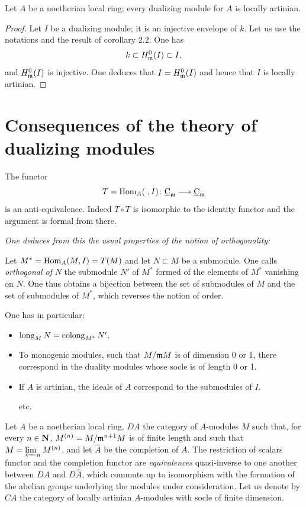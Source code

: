 \begin{corollary} \label{IV.4.9}
Let $A$ be a noetherian local ring; every dualizing module for $A$ is locally artinian.
\end{corollary}

\begin{proof}
Let $I$ be a dualizing module; it is an injective envelope of $k$. Let us use the notations and the result of corollary 2.2. One has
$$
k\subset H^{0}_{\mm}(I)\subset I,
$$
and $H^{0}_{\mm}(I)$ is injective. One deduces that $I=H^{0}_{\mm}(I)$ and hence that $I$ is locally artinian.
\skipqed
\end{proof}

\section{Consequences of the theory of dualizing modules} \label{IV.5}

The functor
$$
T=\Hom_{A}(\;, I)\colon \ccat_{\mm}\to \ccat_{\mm}
$$
is an anti-equivalence. Indeed $T\circ T$ is isomorphic to the identity functor and the argument is formal from there.

\emph{One deduces from this the usual properties of the notion of orthogonality:}

Let $M^{*}=\Hom_{A}(M, I)=T(M)$ and let $N\subset M$ be a submodule. One calls \emph{orthogonal of} $N$ the submodule $N'$ of $M^{*}$ formed of the elements of $M^*$ vanishing on $N$. One thus obtains a bijection between the set of submodules of $M$ and the set of submodules of $M^{*}$, which reverses the notion of order.

One has in particular:
\begin{itemize}
\item
$\longueur_{M}N=\colong_{M^{*}}N'$.
\item
To monogenic modules, \ie such that $M/\mm M$ is of dimension 0 or 1, there correspond in the duality modules whose socle is of length 0 or 1.
\item
If $A$ is artinian, the ideals of $A$ correspond to the submodules of $I$.
\par\hfill etc.
\end{itemize}

\smallskip
Let $A$ be a noetherian local ring, $DA$ the category of $A$-modules $M$ such that, for every $n\in {\bf N}$, $M^{(n)}=M/\mm^{n+1}M$ is of finite length and such that $M=\varprojlim_{n}M^{(n)}$, and let $\hat{A}$ be the completion of $A$. The restriction of scalars functor and the completion functor are \emph{equivalences} quasi-inverse to one another between $DA$ and $D\hat{A}$, which commute up to isomorphism with the formation of the abelian groups underlying the modules under consideration. Let us denote by $CA$ the category of locally artinian $A$-modules with socle of finite dimension.

